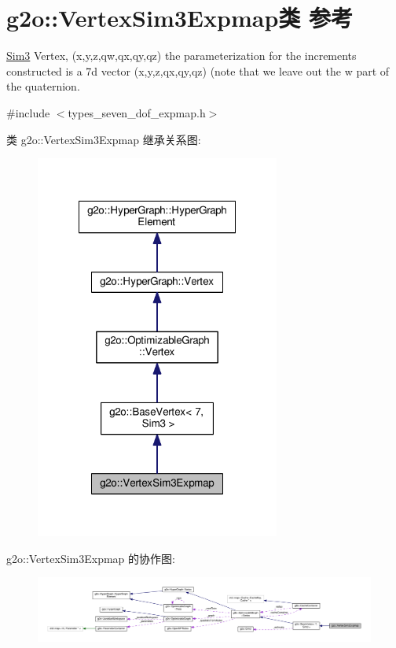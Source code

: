 \hypertarget{classg2o_1_1VertexSim3Expmap}{\section{g2o\-:\-:Vertex\-Sim3\-Expmap类 参考}
\label{classg2o_1_1VertexSim3Expmap}
}


\hyperlink{structg2o_1_1Sim3}{Sim3} Vertex, (x,y,z,qw,qx,qy,qz) the parameterization for the increments constructed is a 7d vector (x,y,z,qx,qy,qz) (note that we leave out the w part of the quaternion.  




{\ttfamily \#include $<$types\-\_\-seven\-\_\-dof\-\_\-expmap.\-h$>$}



类 g2o\-:\-:Vertex\-Sim3\-Expmap 继承关系图\-:
\nopagebreak
\begin{figure}[H]
\begin{center}
\leavevmode
\includegraphics[width=228pt]{classg2o_1_1VertexSim3Expmap__inherit__graph}
\end{center}
\end{figure}


g2o\-:\-:Vertex\-Sim3\-Expmap 的协作图\-:
\nopagebreak
\begin{figure}[H]
\begin{center}
\leavevmode
\includegraphics[width=350pt]{classg2o_1_1VertexSim3Expmap__coll__graph}
\end{center}
\end{figure}
